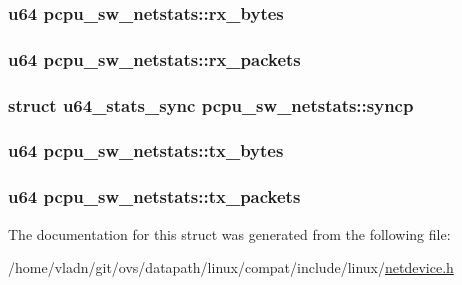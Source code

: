 \subsubsection[{rx\+\_\+bytes}]{\setlength{\rightskip}{0pt plus 5cm}u64 pcpu\+\_\+sw\+\_\+netstats\+::rx\+\_\+bytes}\label{structpcpu__sw__netstats_ae71ad7ad7c404b7820d022d42c515a70}
\hypertarget{structpcpu__sw__netstats_aef09f7c9a31a557c278f7768f6d54488}{}
\subsubsection[{rx\+\_\+packets}]{\setlength{\rightskip}{0pt plus 5cm}u64 pcpu\+\_\+sw\+\_\+netstats\+::rx\+\_\+packets}\label{structpcpu__sw__netstats_aef09f7c9a31a557c278f7768f6d54488}
\hypertarget{structpcpu__sw__netstats_a09b11d813594941c06b3e1e818a9b543}{}
\subsubsection[{syncp}]{\setlength{\rightskip}{0pt plus 5cm}struct {\bf u64\+\_\+stats\+\_\+sync} pcpu\+\_\+sw\+\_\+netstats\+::syncp}\label{structpcpu__sw__netstats_a09b11d813594941c06b3e1e818a9b543}
\hypertarget{structpcpu__sw__netstats_ab017757f36d020e04458ef3748fe1d69}{}
\subsubsection[{tx\+\_\+bytes}]{\setlength{\rightskip}{0pt plus 5cm}u64 pcpu\+\_\+sw\+\_\+netstats\+::tx\+\_\+bytes}\label{structpcpu__sw__netstats_ab017757f36d020e04458ef3748fe1d69}
\hypertarget{structpcpu__sw__netstats_a1b3e22436ccc3b5d13124f481eb2261f}{}
\subsubsection[{tx\+\_\+packets}]{\setlength{\rightskip}{0pt plus 5cm}u64 pcpu\+\_\+sw\+\_\+netstats\+::tx\+\_\+packets}\label{structpcpu__sw__netstats_a1b3e22436ccc3b5d13124f481eb2261f}


The documentation for this struct was generated from the following file\+:\begin{DoxyCompactItemize}
\item 
/home/vladn/git/ovs/datapath/linux/compat/include/linux/\hyperlink{netdevice_8h}{netdevice.\+h}\end{DoxyCompactItemize}
